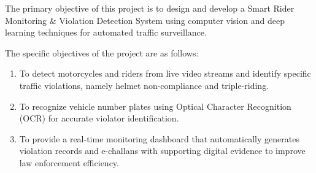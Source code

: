 The primary objective of this project is to design and develop a Smart Rider Monitoring \& Violation Detection System using computer vision and deep learning techniques for automated traffic surveillance.

The specific objectives of the project are as follows:
\begin{enumerate}
\item To detect motorcycles and riders from live video streams and identify specific traffic violations, namely helmet non-compliance and triple-riding.
\item To recognize vehicle number plates using Optical Character Recognition (OCR) for accurate violator identification.
\item To provide a real-time monitoring dashboard that automatically generates violation records and e-challans with supporting digital evidence to improve law enforcement efficiency.
\end{enumerate}